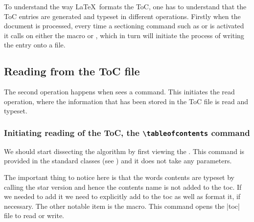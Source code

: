 \begin{macro}{\addcontentsline}
\begin{macro}{\addcontents}
To understand the way \LaTeX\ formats the ToC, one has to understand that the ToC entries are generated and typeset in different operations. Firstly when the document is processed, every time a sectioning command such as  or  is activated it calls on either the macro  or , which in turn will initiate the process of writing the entry onto a file.
\end{macro}
\end{macro}


\subsection{Reading from the ToC file}

\begin{macro}{\tableofcontents}
The second operation happens when \latexe sees a  command. This initiates the read operation, where the information that has been stored in the ToC file is read and typeset.
\end{macro}


\subsubsection{Initiating reading of the ToC, the \texttt{\textbackslash tableofcontents} command}

We should start dissecting the algorithm by first viewing the . This command is provided in
the standard classes (see \pageref{tableofcontents}) and it does not take any parameters.

\begin{teXX}
\setcounter{tocdepth}{2}
\newcommand\tableofcontents{%
    \if@twocolumn
      \@restonecoltrue\onecolumn
    \else
      \@restonecolfalse
    \fi
    \chapter*{\contentsname
        \@mkboth{%
           \MakeUppercase\contentsname}{\MakeUppercase\contentsname}}%
          \@starttoc{toc} (*@\label{starttoc}@*)
    \if@restonecol\twocolumn\fi
    }
\end{teXX}


The important thing to notice here is that the words contents are typeset by calling the star version and hence the contents name is not added to the toc. If we needed to add it we need to explicitly add to the toc as well as format it, if necessary. The other notable item is the  macro. This command opens the |toc| file to read or write.

